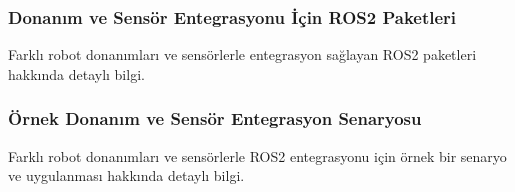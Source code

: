 \subsubsection{Donanım ve Sensör Entegrasyonu İçin ROS2 Paketleri}
Farklı robot donanımları ve sensörlerle entegrasyon sağlayan ROS2 paketleri hakkında detaylı bilgi.

\subsubsection{Örnek Donanım ve Sensör Entegrasyon Senaryosu}
Farklı robot donanımları ve sensörlerle ROS2 entegrasyonu için örnek bir senaryo ve uygulanması hakkında detaylı bilgi.
